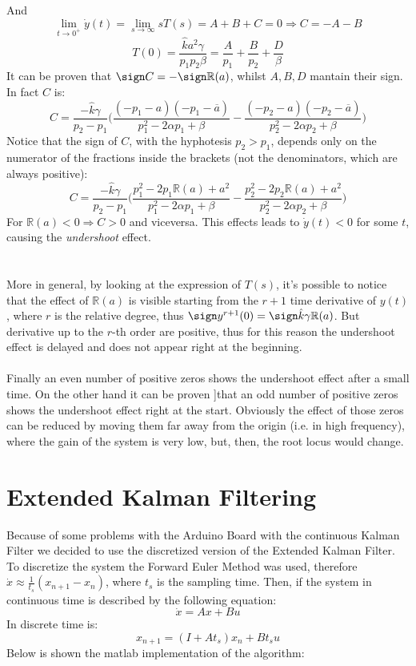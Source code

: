 And $$\lim_{t \to 0^{+}} \dot{y}(t) = \lim_{s \to \infty} sT(s) = A+B+C=0 \Rightarrow C=-A-B$$
$$T(0)= \frac{\hat{k}a^2\gamma}{p_1 p_2 \beta } = \frac{A}{p_1} + \frac{B}{p_2} + \frac{D}{\beta}$$
It can be proven that $\sign C =  - \sign \mathbb{R}(a)$, whilst $A,B,D$ mantain their sign. In fact $C$ is:
$$C=\frac{-\hat{k}\gamma}{p_2-p_1} \Big( \frac{(-p_1-a)(-p_1-\overline{a})}{p_1^2-2\alpha p_1+\beta} -\frac{(-p_2-a)(-p_2-\overline{a})}{p_2^2-2\alpha p_2+\beta} \Big) $$
Notice that the sign of $C$, with the hyphotesis $p_2 > p_1$, depends only on the numerator of the fractions inside the brackets (not the denominators, which are always positive):
$$C=\frac{-\hat{k}\gamma}{p_2-p_1}\Big ( \frac{p_1^2 -2p_1 \mathbb{R}(a) +a^2}{p_1^2-2\alpha p_1+\beta} -\frac{p_2^2 -2p_2 \mathbb{R}(a) +a^2}{p_2^2-2\alpha p_2+\beta} \Big)$$
For $\mathbb{R}(a) < 0 \Rightarrow C > 0$ and viceversa. This effects leads to $\dot{y}(t) <0$ for some $t$, causing the \emph{undershoot} effect.  \\ \\ \\
More in general, by looking at the expression of $T(s)$, it's possible to notice that the effect of $\mathbb{R}(a)$ is visible starting from the $r+1$ time derivative of $y(t)$, where $r$ is the relative degree, thus $\sign y^{r+1}(0)  = \sign \hat{k}\gamma \mathbb{R}(a)$. But derivative up to the $r$-th order are positive, thus for this reason the undershoot effect is delayed and does not appear right at the beginning. \\ \\
Finally an even number of positive zeros shows the undershoot effect  after a small time. On the other hand it can be proven  \cite{hoagg2006}]that an odd number of positive zeros shows the undershoot effect right at the start. Obviously the effect of those zeros can be reduced by moving them far away from the origin (i.e. in high frequency), where the gain of the system is very low,  but, then, the root locus would change. \\

\section{Extended Kalman Filtering}
Because of some problems with the Arduino Board with the continuous Kalman Filter we decided to use the discretized version of the Extended Kalman Filter.  To discretize the system the Forward Euler Method was used, therefore $\dot{x} \approx \frac{1}{t_s}(x_{n+1}-x_{n})$, where $t_s$ is the sampling time. Then, if the system in continuous time is described by the following equation:
\begin{equation}
\dot{x}=Ax+Bu
\end{equation}
In discrete time is:
\begin{equation}
x_{n+1}=(I+At_s)x_n + B t_s u
\end{equation}
Below is shown the matlab implementation of the algorithm:

